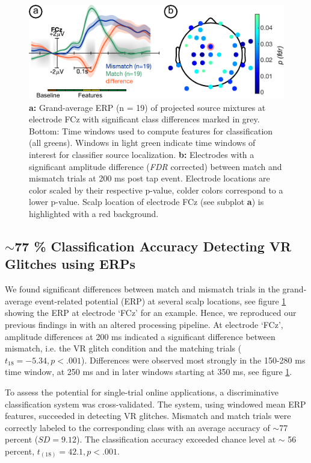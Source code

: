 
\begin{figure}[h]
  \includegraphics[width=.7\textwidth]{figures/erp_FCZ_diff_delay_with_scalp_map.pdf}
  \caption{\textcolor{n}{\textbf{a:}} Grand-average ERP (n = 19) of projected source mixtures at electrode FCz with significant class differences marked in grey. Bottom: Time windows used to compute features for classification (all greens). Windows in light green indicate time windows of interest for classifier source localization. \textcolor{n}{\textbf{b:} Electrodes with a significant amplitude difference (\textit{FDR} corrected) between match and mismatch trials at 200 ms post tap event. Electrode locations are color scaled by their respective p-value, colder colors correspond to a lower p-value. Scalp location of electrode FCz (see subplot \textbf{a}) is highlighted with a red background.}}
  \label{erp}
\end{figure}

\subsection{$\sim$77 \% Classification Accuracy Detecting VR Glitches using ERPs}

We found significant differences between match and mismatch trials in the grand-average event-related potential (ERP) at several scalp locations, see figure \ref{erp} showing the ERP at electrode `FCz' for an example. Hence, we reproduced our previous findings in \cite{Gehrke2019-og} with an altered processing pipeline. At electrode `FCz', amplitude differences at 200 ms indicated a significant difference between mismatch, i.e. the VR glitch condition and the matching trials ($t_{18} = -5.34, p < .001$). Differences were observed most strongly in the 150-280 ms time window, at 250 ms and in later windows starting at 350 ms, see figure \ref{erp}.

To assess the potential for single-trial online applications, a discriminative classification system was cross-validated. The system, using windowed mean ERP features, succeeded in detecting VR glitches. Mismatch and match trials were correctly labeled to the corresponding class with an average accuracy of $\sim$77 percent ($SD = 9.12$). The classification accuracy exceeded chance level at $\sim$ 56 percent, $t_{(18)} = 42.1, p < .001$. 

